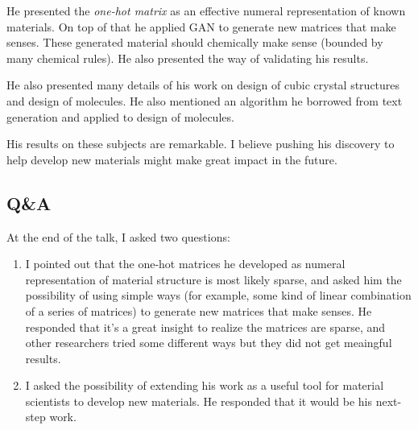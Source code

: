 \documentclass[11pt, oneside]{article}   	%
\begin{document}
He presented the \emph{one-hot matrix} as an effective numeral
representation of known materials. On top of that he applied GAN to
generate new matrices that make senses. These generated material
should chemically make sense (bounded by many chemical rules). He also
presented the way of validating his results.


He also presented many details of his work on design of cubic crystal
structures and design of molecules. He also mentioned an algorithm
he borrowed from text generation and applied to design of
molecules.


His results on these subjects are remarkable. I believe pushing his
discovery to help develop new materials might make great impact in the
future.



\subsection{Q\&A}
At the end of the talk, I asked two questions: 
\begin{enumerate}
\item I pointed out that the one-hot matrices he developed as numeral
  representation of material structure is most likely sparse, and
  asked him the possibility of using simple ways (for example, some
  kind of linear combination of a series of matrices) to generate new
  matrices that make senses. He responded that it's a great insight to
  realize the matrices are sparse, and other researchers tried some
  different ways but they did not get meaingful results.
  
\item I asked the possibility of extending his work as a useful tool
  for material scientists to develop new materials. He responded that
  it would be his next-step work.
  
\end{enumerate}

%
%
%
%
%
%

%
%
\end{document}
